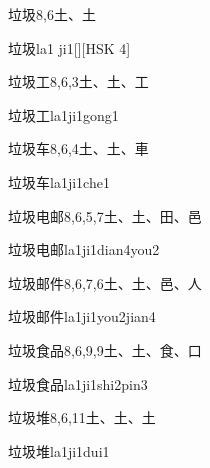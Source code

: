 \begin{entry}{垃圾}{8,6}{⼟、⼟}
  \begin{phonetics}{垃圾}{la1 ji1}[][HSK 4]
  \end{phonetics}
\end{entry}

\begin{entry}{垃圾工}{8,6,3}{⼟、⼟、⼯}
  \begin{phonetics}{垃圾工}{la1ji1gong1}
  \end{phonetics}
\end{entry}

\begin{entry}{垃圾车}{8,6,4}{⼟、⼟、⾞}
  \begin{phonetics}{垃圾车}{la1ji1che1}
  \end{phonetics}
\end{entry}

\begin{entry}{垃圾电邮}{8,6,5,7}{⼟、⼟、⽥、⾢}
  \begin{phonetics}{垃圾电邮}{la1ji1dian4you2}
  \end{phonetics}
\end{entry}

\begin{entry}{垃圾邮件}{8,6,7,6}{⼟、⼟、⾢、⼈}
  \begin{phonetics}{垃圾邮件}{la1ji1you2jian4}
  \end{phonetics}
\end{entry}

\begin{entry}{垃圾食品}{8,6,9,9}{⼟、⼟、⾷、⼝}
  \begin{phonetics}{垃圾食品}{la1ji1shi2pin3}
  \end{phonetics}
\end{entry}

\begin{entry}{垃圾堆}{8,6,11}{⼟、⼟、⼟}
  \begin{phonetics}{垃圾堆}{la1ji1dui1}
  \end{phonetics}
\end{entry}

